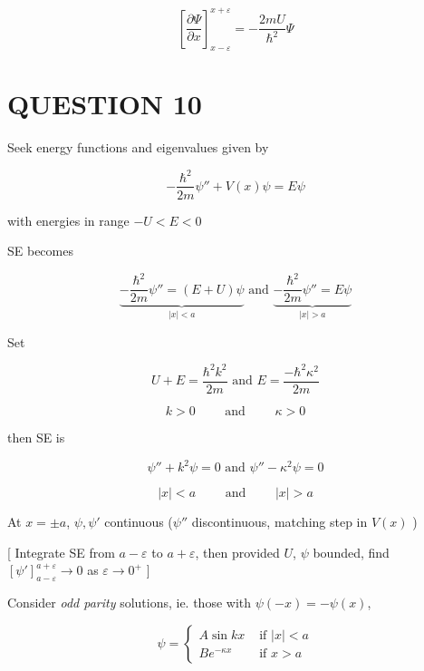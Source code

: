 \documentclass[a4paper]{article}
\begin{document}
\[  \left[ \frac{\partial \Psi }{\partial x} \right]_{x - \varepsilon}^{x + \varepsilon} = -  \frac{2mU }{\hbar^{2}}  \Psi   \]



\section{QUESTION 10}

	\begin{center}
\end{center}

Seek energy functions and eigenvalues given by

\[ -\frac{\hbar^{2}}{2m} \psi''  + V(x) \psi = E \psi \]

with energies in range $ -U < E < 0 $

SE becomes 

\[ \underbrace{-\frac{\hbar^{2}}{2m} \psi'' = (E+U) \psi}_{| x | < a} \text{ and } \underbrace{-\frac{\hbar^{2}}{2m} \psi'' = E \psi}_{| x | > a}  \]

Set 

\[ U + E = \frac{\hbar^{2}k^{2}}{2m} \text{ and } E = \frac{-\hbar^{2}\kappa^{2}}{2m}   \]

\[ k > 0 \qquad \text{ and } \qquad \kappa > 0 \]

then SE is 

\[ \psi''  + k^{2} \psi = 0 \text{ and } \psi'' - \kappa^{2} \psi = 0 \]

\[ | x | < a \qquad \text{ and } \qquad | x | > a \]

At $ x = \pm a $, $ \psi,\psi' $ continuous ($ \psi'' $ discontinuous, matching step in $ V(x) $ )

[ Integrate SE from $ a - \varepsilon $ to $ a + \varepsilon $, then provided $ U $, $ \psi $ bounded, find $ [\psi']_{a - \varepsilon}^{a + \varepsilon} \to 0 $ as $ \varepsilon \to 0^{+} $ ]

Consider \emph{odd parity} solutions, ie. those with $ \psi(-x) = -\psi(x) $,

\[ \psi = \begin{cases} A \sin k x  & \text{ if } | x | < a \\ Be^{-\kappa x} & \text{ if } x > a \end{cases} \]
\end{document}

